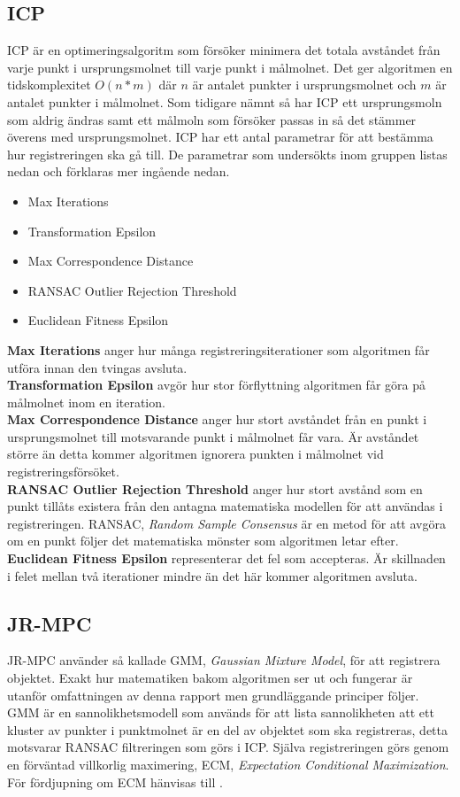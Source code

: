 \subsection{ICP}
ICP är en optimeringsalgoritm som försöker minimera det totala avståndet från varje punkt i ursprungsmolnet till varje punkt i målmolnet. Det ger algoritmen en tidskomplexitet $ \mathit{O(n*m)} $ där $ \mathit{n} $ är antalet punkter i ursprungsmolnet och $ \mathit{m} $ är antalet punkter i målmolnet. Som tidigare nämnt så har ICP ett ursprungsmoln som aldrig ändras samt ett målmoln som försöker passas in så det stämmer överens med ursprungsmolnet. ICP har ett antal parametrar för att bestämma hur registreringen ska gå till. De parametrar som undersökts inom gruppen listas nedan och förklaras mer ingående nedan.
\begin{itemize}
	\item Max Iterations
	\item Transformation Epsilon
	\item Max Correspondence Distance
	\item RANSAC Outlier Rejection Threshold
	\item Euclidean Fitness Epsilon
\end{itemize}
\textbf{Max Iterations} anger hur många registrerings\-iterationer som algoritmen får utföra innan den tvingas avsluta.\\
\textbf{Transformation Epsilon} avgör hur stor förflyttning algoritmen får göra på målmolnet inom en iteration.\\
\textbf{Max Correspondence Distance} anger hur stort avståndet från en punkt i ursprungsmolnet till motsvarande punkt i målmolnet får vara. Är avståndet större än detta kommer algoritmen ignorera punkten i målmolnet vid registreringsförsöket.\\
\textbf{RANSAC Outlier Rejection Threshold} anger hur stort avstånd som en punkt tillåts existera från den antagna matematiska modellen för att användas i registreringen. RANSAC, \textit{Random Sample Consensus} är en metod för att avgöra om en punkt följer det matematiska mönster som algoritmen letar efter.\\
\textbf{Euclidean Fitness Epsilon} representerar det fel som accepteras. Är skillnaden i felet mellan två iterationer mindre än det här kommer algoritmen avsluta.\\



\subsection{JR-MPC}
JR-MPC använder så kallade GMM, \textit{Gaussian Mixture Model}, för att registrera objektet. Exakt hur matematiken bakom algoritmen ser ut och fungerar är utanför omfattningen av denna rapport men grundläggande principer följer. GMM är en sannolikhetsmodell som används för att lista sannolikheten att ett kluster av punkter i punktmolnet är en del av objektet som ska registreras, detta motsvarar RANSAC filtreringen som görs i ICP. Själva registreringen görs genom en förväntad villkorlig maximering, ECM, \textit{Expectation Conditional Maximization}. För fördjupning om ECM hänvisas till \cite{}.

